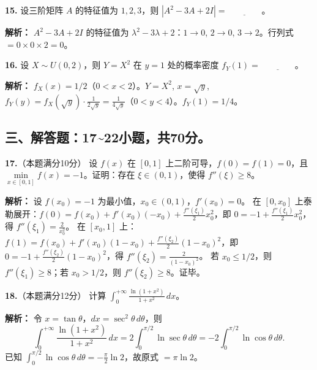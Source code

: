 \vspace{8pt}

\textbf{15.} 设三阶矩阵 $A$ 的特征值为 $1,2,3$，则 $|A^2 - 3A + 2I| = \underline{\qquad\qquad}$。

\ifshowsolutions\par\noindent\textbf{解析：} $A^2-3A+2I$ 的特征值为 $\lambda^2-3\lambda+2$：$1\to0$, $2\to0$, $3\to2$。行列式 $=0\times0\times2=0$。\else \answerarea \fi

\vspace{8pt}

\textbf{16.} 设 $X \sim U(0,2)$，则 $Y=X^2$ 在 $y=1$ 处的概率密度 $f_Y(1) = \underline{\qquad\qquad}$。

\ifshowsolutions\par\noindent\textbf{解析：} $f_X(x)=1/2$（$0<x<2$）。$Y=X^2$, $x=\sqrt{y}$, $f_Y(y)=f_X(\sqrt{y})\cdot\frac{1}{2\sqrt{y}} = \frac{1}{4\sqrt{y}}$（$0<y<4$）。$f_Y(1)=1/4$。
\else \answerarea \fi

\newpage

\subsection*{三、解答题：17\textasciitilde22小题，共70分。}

\textbf{17.}（本题满分10分）
设 $f(x)$ 在 $[0,1]$ 上二阶可导，$f(0)=f(1)=0$，且 $\min\limits_{x\in[0,1]}f(x) = -1$。证明：存在 $\xi \in (0,1)$，使得 $f''(\xi) \geqslant 8$。

\ifshowsolutions\par\noindent\textbf{解析：} 设 $f(x_0)=-1$ 为最小值，$x_0\in(0,1)$，$f'(x_0)=0$。
在 $[0,x_0]$ 上泰勒展开：$f(0)=f(x_0)+f'(x_0)(-x_0)+\frac{f''(\xi_1)}{2}x_0^2$，即 $0=-1+\frac{f''(\xi_1)}{2}x_0^2$，得 $f''(\xi_1)=\frac{2}{x_0^2}$。
在 $[x_0,1]$ 上：$f(1)=f(x_0)+f'(x_0)(1-x_0)+\frac{f''(\xi_2)}{2}(1-x_0)^2$，即 $0=-1+\frac{f''(\xi_2)}{2}(1-x_0)^2$，得 $f''(\xi_2)=\frac{2}{(1-x_0)^2}$。
若 $x_0\leqslant1/2$，则 $f''(\xi_1)\geqslant8$；若 $x_0>1/2$，则 $f''(\xi_2)\geqslant8$。证毕。\else \answerarea[8] \fi

\vspace{8pt}

\textbf{18.}（本题满分12分）
计算 $\displaystyle\int_{0}^{+\infty} \frac{\ln(1+x^2)}{1+x^2}\,dx$。

\ifshowsolutions\par\noindent\textbf{解析：} 令 $x=\tan\theta$，$dx=\sec^2\theta\,d\theta$，则
\[
\int_0^{+\infty}\frac{\ln(1+x^2)}{1+x^2}\,dx
=2\int_0^{\pi/2}\ln\sec\theta\,d\theta
=-2\int_0^{\pi/2}\ln\cos\theta\,d\theta.
\]
已知 $\int_0^{\pi/2}\ln\cos\theta\,d\theta = -\frac{\pi}{2}\ln2$，故原式 $= \pi\ln2$。\else \answerarea[8] \fi

